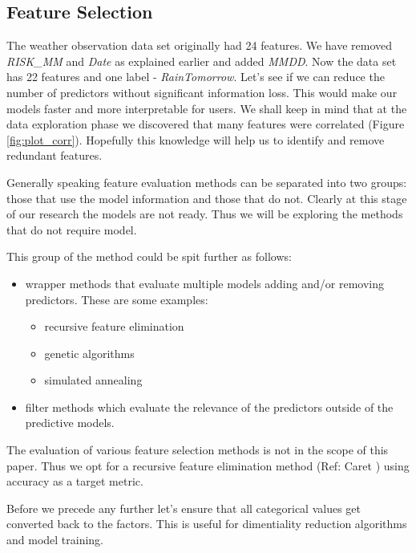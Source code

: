 \hypertarget{feature-selection}{%
\subsection{Feature Selection}\label{feature-selection}}

The weather observation data set originally had 24 features. We have
removed \emph{RISK\_MM} and \emph{Date} as explained earlier and added
\emph{MMDD}. Now the data set has 22 features and one label -
\emph{RainTomorrow}. Let's see if we can reduce the number of predictors
without significant information loss. This would make our models faster
and more interpretable for users. We shall keep in mind that at the data
exploration phase we discovered that many features were correlated
(Figure \ref{fig:plot_corr}). Hopefully this knowledge will help us to
identify and remove redundant features.

Generally speaking feature evaluation methods can be separated into two
groups: those that use the model information and those that do not.
Clearly at this stage of our research the models are not ready. Thus we
will be exploring the methods that do not require model.

This group of the method could be spit further as follows:

\begin{itemize}
\tightlist
\item
  wrapper methods that evaluate multiple models adding and/or removing
  predictors. These are some examples:

  \begin{itemize}
  \tightlist
  \item
    recursive feature elimination
  \item
    genetic algorithms
  \item
    simulated annealing
  \end{itemize}
\item
  filter methods which evaluate the relevance of the predictors outside
  of the predictive models.
\end{itemize}

The evaluation of various feature selection methods is not in the scope
of this paper. Thus we opt for a recursive feature elimination method
(Ref: Caret \cite{caret}) using accuracy as a target metric.

Before we precede any further let's ensure that all categorical values
get converted back to the factors. This is useful for dimentiality
reduction algorithms and model training.


